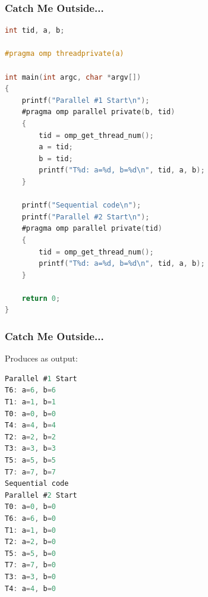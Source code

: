 \begin{frame}[fragile]
\frametitle{Catch Me Outside...}

\begin{lstlisting}[language=C,morekeywords={foreach,pragma,omp,parallel,single,nowait,task,untied,barrier,taskyield}]
int tid, a, b;

#pragma omp threadprivate(a)

int main(int argc, char *argv[])
{
    printf("Parallel #1 Start\n");
    #pragma omp parallel private(b, tid)
    {
        tid = omp_get_thread_num();
        a = tid;
        b = tid;
        printf("T%d: a=%d, b=%d\n", tid, a, b);
    }

    printf("Sequential code\n");
    printf("Parallel #2 Start\n");
    #pragma omp parallel private(tid)
    {
        tid = omp_get_thread_num();
        printf("T%d: a=%d, b=%d\n", tid, a, b);
    }

    return 0;
}    
  \end{lstlisting}

\end{frame}


\begin{frame}[fragile]
\frametitle{Catch Me Outside...}

Produces as output: 
\begin{lstlisting}[language=C,morekeywords={foreach,pragma,omp,parallel,single,nowait,task,untied,barrier,taskyield}]
% ./a.out
Parallel #1 Start
T6: a=6, b=6
T1: a=1, b=1
T0: a=0, b=0
T4: a=4, b=4
T2: a=2, b=2
T3: a=3, b=3
T5: a=5, b=5
T7: a=7, b=7
Sequential code
Parallel #2 Start
T0: a=0, b=0
T6: a=6, b=0
T1: a=1, b=0
T2: a=2, b=0
T5: a=5, b=0
T7: a=7, b=0
T3: a=3, b=0
T4: a=4, b=0
\end{lstlisting}



\end{frame}






